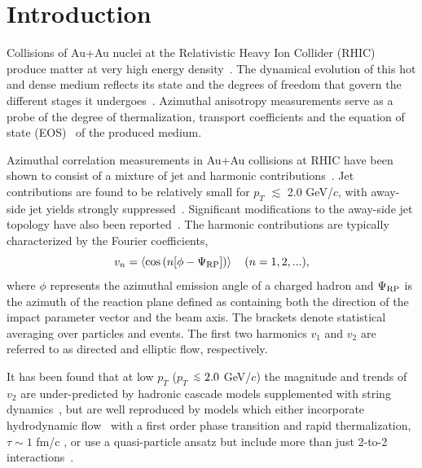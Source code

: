 \documentclass[aps,prc,superscriptaddress,showpacs,floatfix,twocolumn]{revtex4}
\def\v2{\mbox{$v_2$}}
\newcommand \gevc{GeV/$c$\xspace}
\newcommand \pt{\mbox{$p_T$}\xspace}
\newcommand \RP{\mbox{$\Psi_{\rm{RP}}$}\xspace}
\newcommand \Au{{Au+Au}\xspace}
\begin{document}

\section{Introduction \label{sec:introduction}}

Collisions of \Au nuclei at the Relativistic Heavy Ion Collider 
(RHIC) produce matter at very high energy 
density~\cite{Arsene:2004fa,Adcox:2004mh,Back:2004je,Adams:2005dq}. 
The dynamical evolution of this hot and dense medium reflects 
its state and the degrees of freedom that govern the different 
stages it 
undergoes~\cite{Gyulassy:2004zy,Muller:2004kk,Shuryak:2004cy}. 
Azimuthal anisotropy measurements serve as a probe of the degree 
of thermalization, transport coefficients and the equation of 
state (EOS)~\cite{Ollitrault:1992bk,Kolb:2001qz,Hirano:2004en} 
of the produced medium.

Azimuthal correlation measurements in \Au collisions at RHIC 
have been shown to consist of a mixture of jet and harmonic 
contributions~\cite{Ajitanand:2002qd,Chiu:2002ma,Adler:2002tq,Adler:2004zd}. 
Jet contributions are found to be relatively small for \pt 
$\lesssim$ 2.0 \gevc, with away-side jet yields strongly 
suppressed~\cite{Adler:2002tq}. Significant modifications to the 
away-side jet topology have also been 
reported~\cite{Adams:2005ph,Adler:2005ee,Adare:2008cqb}. The 
harmonic contributions are typically characterized by the 
Fourier coefficients,
\begin{equation}
v_n = \left<\cos{(n[\phi-\RP])}\right> \quad (n = 1, 2, ...),
\end{equation}
where $\phi$ represents the azimuthal emission angle of a 
charged hadron and \RP is the azimuth of the reaction plane 
defined as containing both the direction of the impact parameter 
vector and the beam axis. The brackets denote statistical 
averaging over particles and events. The first two harmonics 
$v_1$ and $v_2$ are referred to as directed and elliptic flow, 
respectively.

It has been found that at low \pt 
(\pt~$\mathbin{\lower.3ex\hbox{$\buildrel<\over 
{\smash{\scriptstyle\sim}\vphantom{_x}}$}}~2.0$ \gevc) the 
magnitude and trends of \v2 are under-predicted by hadronic 
cascade models supplemented with string 
dynamics~\cite{Bleicher:2000sx}, but are well reproduced by 
models which either incorporate hydrodynamic 
flow~\cite{Shuryak:2004cy,Kolb:2001qz} with a first order phase 
transition and rapid thermalization, $\tau \sim 1$ fm/c 
\cite{Adler:2003kt}, or use a quasi-particle ansatz but include 
more than just 2-to-2 interactions~\cite{Xu:2008dv}.
\end{document}
